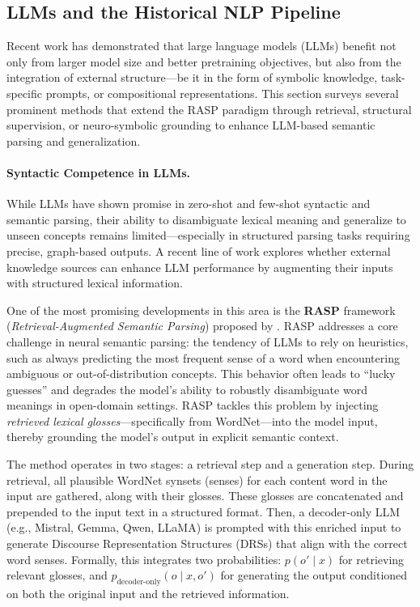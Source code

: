 \subsection{LLMs and the Historical NLP Pipeline}

Recent work has demonstrated that large language models (LLMs) benefit not only from larger model size and better pretraining objectives, but also from the integration of external structure—be it in the form of symbolic knowledge, task-specific prompts, or compositional representations. This section surveys several prominent methods that extend the RASP paradigm through retrieval, structural supervision, or neuro-symbolic grounding to enhance LLM-based semantic parsing and generalization.

\paragraph{Syntactic Competence in LLMs.} While LLMs have shown promise in zero-shot and few-shot syntactic and semantic parsing, their ability to disambiguate lexical meaning and generalize to unseen concepts remains limited—especially in structured parsing tasks requiring precise, graph-based outputs. A recent line of work explores whether external knowledge sources can enhance LLM performance by augmenting their inputs with structured lexical information.

One of the most promising developments in this area is the \textbf{RASP} framework (\textit{Retrieval-Augmented Semantic Parsing}) proposed by \citet{zhang2024rasp}. RASP addresses a core challenge in neural semantic parsing: the tendency of LLMs to rely on heuristics, such as always predicting the most frequent sense of a word when encountering ambiguous or out-of-distribution concepts. This behavior often leads to ``lucky guesses'' and degrades the model's ability to robustly disambiguate word meanings in open-domain settings. RASP tackles this problem by injecting \textit{retrieved lexical glosses}—specifically from WordNet—into the model input, thereby grounding the model's output in explicit semantic context.

The method operates in two stages: a retrieval step and a generation step. During retrieval, all plausible WordNet synsets (senses) for each content word in the input are gathered, along with their glosses. These glosses are concatenated and prepended to the input text in a structured format. Then, a decoder-only LLM (e.g., Mistral, Gemma, Qwen, LLaMA) is prompted with this enriched input to generate Discourse Representation Structures (DRSs) that align with the correct word senses. Formally, this integrates two probabilities: \( p(o' \mid x) \) for retrieving relevant glosses, and \( p_{\text{decoder-only}}(o \mid x, o') \) for generating the output conditioned on both the original input and the retrieved information.

